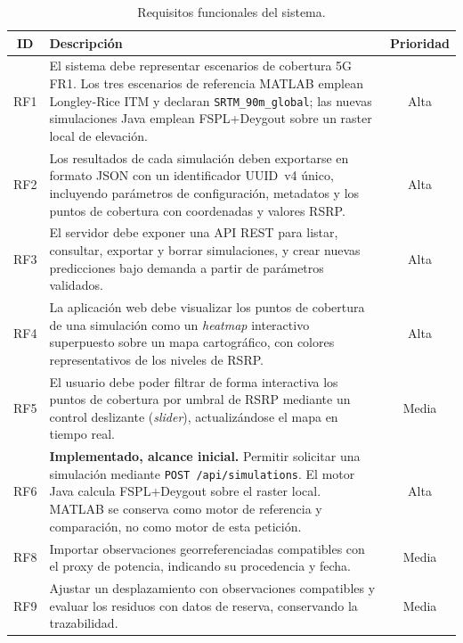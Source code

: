 \begin{table}[H]
\centering
\caption{Requisitos funcionales del sistema.}
\label{tab:req_func}
\begin{tabular}{|c|p{10cm}|c|}
\hline
\textbf{ID} & \textbf{Descripción} & \textbf{Prioridad} \\
\hline
RF1 & El sistema debe representar escenarios de cobertura 5G FR1. Los tres
      escenarios de referencia MATLAB emplean Longley-Rice ITM y declaran
      \texttt{SRTM\_90m\_global}; las nuevas simulaciones Java emplean
      FSPL+Deygout sobre un raster local de elevación. & Alta \\
\hline
RF2 & Los resultados de cada simulación deben exportarse en formato JSON
      con un identificador UUID~v4 único, incluyendo parámetros de
      configuración, metadatos y los puntos de cobertura con coordenadas
      y valores RSRP. & Alta \\
\hline
RF3 & El servidor debe exponer una API REST para listar, consultar, exportar y
      borrar simulaciones, y crear nuevas predicciones bajo demanda a partir de
      parámetros validados. & Alta \\
\hline
RF4 & La aplicación web debe visualizar los puntos de cobertura de una
      simulación como un \textit{heatmap} interactivo superpuesto sobre
      un mapa cartográfico, con colores representativos de los niveles
      de RSRP. & Alta \\
\hline
RF5 & El usuario debe poder filtrar de forma interactiva los puntos de
      cobertura por umbral de RSRP mediante un control deslizante
      (\textit{slider}), actualizándose el mapa en tiempo real. & Media \\
\hline
RF6 & \textbf{Implementado, alcance inicial.} Permitir solicitar una
      simulación mediante \texttt{POST /api/simulations}. El motor Java
      calcula FSPL+Deygout sobre el raster local. MATLAB se conserva como
      motor de referencia y comparación, no como motor de esta petición. & Alta \\
\hline
RF8 & Importar observaciones georreferenciadas compatibles con el proxy
      de potencia, indicando su procedencia y fecha. & Media \\
\hline
RF9 & Ajustar un desplazamiento con observaciones compatibles y evaluar
      los residuos con datos de reserva, conservando la trazabilidad. & Media \\
\hline
\end{tabular}
\end{table}

